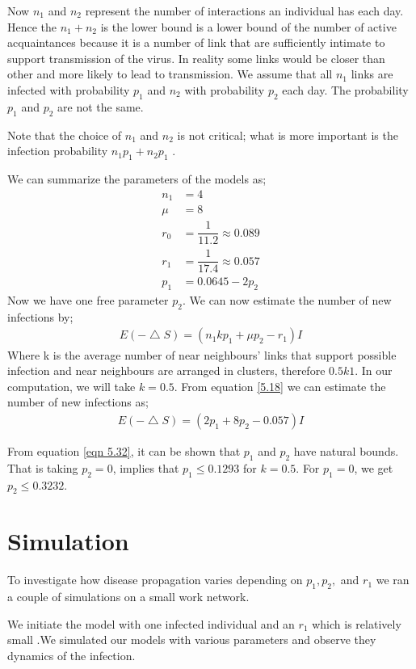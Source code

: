 Now $n_1$ and $n_2$ represent the number of interactions an individual has each day. Hence the  $n_1 + n_2$ is the lower bound is a lower bound of the number of active acquaintances because it is a number of link that are sufficiently intimate to support transmission of the virus. In reality some links would be closer than other and more likely to lead to transmission. We assume that all $n_1$ links are infected with probability $p_1$ and $n_2$ with probability $p_2$ each day. The probability $p_1$ and $p_2$ are not the same.

Note that the choice of $n_1$ and $n_2$ is not critical; what is more important is the infection probability $n_1p_1 + n_2p_1$ .

We can summarize the parameters of the models as;
\begin{align}
n_1 &= 4 \\
\mu &= 8 \\
r_0 &= \dfrac{1}{11.2} \approx 0.089 \\
r_1 &= \dfrac{1}{17.4} \approx 0.057 \\
p_1 &= 0.0645 - 2 p_2 \label{eqn 5.1.7}
\end{align}
Now we have one free parameter $p_2$. We can now estimate the number of new infections by;
\begin{align}
E(- \bigtriangleup S) = (n_1 k p_1 + \mu p_2 - r_1) I \label{5.18}
\end{align}
Where k is the average number of near neighbours' links that support possible infection and near neighbours are arranged in clusters, therefore $0.5 k 1$.  In our computation, we will take $k = 0.5$. From equation \ref{5.18} we can estimate the number of new infections as;
\begin{align}
E(- \bigtriangleup S) = (2 p_1 + 8 p_2 - 0.057) I  \label{5.1.9}
\end{align}
 
From equation \ref{eqn 5.32}, it can be shown that $p_1$ and $p_2$ have natural bounds. That is taking $p_2 = 0$, implies that $p_1 \leq 0.1293$ for $k =0. 5$. For $p_1 = 0$, we get $p_2 \leq 0.3232$.
\section{Simulation}
To investigate how disease propagation varies depending on $p_1, p_2, $ and $r_1$ we ran a couple of simulations on a small work network. 

We initiate the model with one infected individual and an $r_1$ which is relatively small .We simulated our models with various parameters and observe they dynamics  of the infection. 

